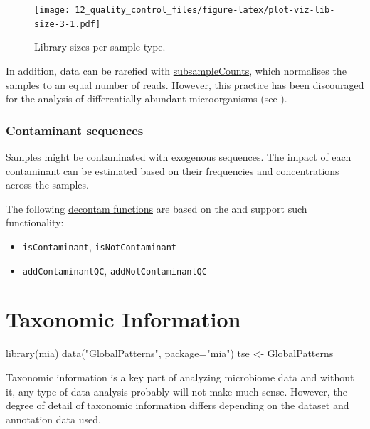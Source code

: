 \documentclass[
]{book}
\newenvironment{Shaded}{\begin{snugshade}}{\end{snugshade}}
\newcommand{\AttributeTok}[1]{\textcolor[rgb]{0.77,0.63,0.00}{#1}}
\newcommand{\FunctionTok}[1]{\textcolor[rgb]{0.00,0.00,0.00}{#1}}
\newcommand{\NormalTok}[1]{#1}
\newcommand{\OtherTok}[1]{\textcolor[rgb]{0.56,0.35,0.01}{#1}}
\newcommand{\StringTok}[1]{\textcolor[rgb]{0.31,0.60,0.02}{#1}}
\providecommand{\tightlist}{%
  \setlength{\itemsep}{0pt}\setlength{\parskip}{0pt}}
\begin{document}
\begin{figure}
\centering
\texttt{[image: 12\_quality\_control\_files/figure-latex/plot-viz-lib-size-3-1.pdf]}
\caption{\label{fig:plot-viz-lib-size-3}Library sizes per sample type.}
\end{figure}

In addition, data can be rarefied with
\href{https://microbiome.github.io/mia/reference/subsampleCounts.html}{subsampleCounts},
which normalises the samples to an equal number of reads. However,
this practice has been discouraged for the analysis of differentially
abundant microorganisms (see \citep{mcmurdie2014waste}).

\hypertarget{contaminant-sequences}{%
\subsection{Contaminant sequences}\label{contaminant-sequences}}

Samples might be contaminated with exogenous sequences. The impact of
each contaminant can be estimated based on their frequencies and
concentrations across the samples.

The following \href{https://microbiome.github.io/mia/reference/isContaminant.html}{decontam
functions}
are based on the \citep{davis2018simple} and support such functionality:

\begin{itemize}
\tightlist
\item
  \texttt{isContaminant}, \texttt{isNotContaminant}
\item
  \texttt{addContaminantQC}, \texttt{addNotContaminantQC}
\end{itemize}

\hypertarget{taxonomic-information}{%
\chapter{Taxonomic Information}\label{taxonomic-information}}

\begin{Shaded}
\begin{Highlighting}[]
\FunctionTok{library}\NormalTok{(mia)}
\FunctionTok{data}\NormalTok{(}\StringTok{"GlobalPatterns"}\NormalTok{, }\AttributeTok{package=}\StringTok{"mia"}\NormalTok{)}
\NormalTok{tse }\OtherTok{\textless{}{-}}\NormalTok{ GlobalPatterns }
\end{Highlighting}
\end{Shaded}

Taxonomic information is a key part of analyzing microbiome data and without
it, any type of data analysis probably will not make much sense. However,
the degree of detail of taxonomic information differs depending on the dataset
and annotation data used.
\end{document}
